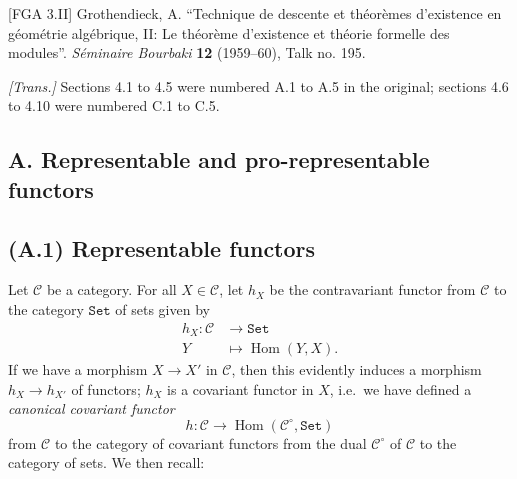 \documentclass{article}
\newcommand{\oldpage}[1]{\marginpar{\footnotesize$\Big\vert$ \textit{p.~#1}}}
\theoremstyle{definition}
\theoremstyle{definition}
\theoremstyle{definition}
\theoremstyle{definition}
\theoremstyle{remark}
\begin{document}
\providecommand{\scr}[1]{{\mathscr{#1}}}
\renewcommand{\cal}[1]{{\mathcal{#1}}}
\renewcommand{\frak}[1]{{\mathfrak{#1}}}
\renewcommand{\geq}{\geqslant}
\renewcommand{\leq}{\leqslant}

\providecommand{\simto}{\xrightarrow{\sim}}
\providecommand{\simfrom}{\xleftarrow{\sim}}
\providecommand{\Set}{\mathtt{Set}}

\providecommand{\id}{\operatorname{id}}
\providecommand{\Hom}{\operatorname{Hom}}
\providecommand{\repHom}{\underline{\Hom}}
\providecommand{\Aut}{\operatorname{Aut}}
\providecommand{\repAut}{\underline{\Aut}}
\providecommand{\HH}{\operatorname{H}}
\providecommand{\RR}{\operatorname{R}}
\providecommand{\GL}{\operatorname{GL}}
\providecommand{\Ga}{\operatorname{G_a}}
\providecommand{\Gm}{\operatorname{G_m}}
\providecommand{\SL}{\operatorname{SL}}
\providecommand{\Sp}{\operatorname{Sp}}
\providecommand{\Spec}{\operatorname{Spec}}
\providecommand{\Pro}{\operatorname{Pro}}
\providecommand{\Ext}{\operatorname{Ext}}
\providecommand{\op}{\circ}

{[}FGA 3.II{]}
Grothendieck, A.
``Technique de descente et théorèmes d'existence en géométrie algébrique, II: Le théorème d'existence et théorie formelle des modules''.
\emph{Séminaire Bourbaki} \textbf{12} (1959--60), Talk no. 195.

\emph{{[}Trans.{]}}
Sections 4.1 to 4.5 were numbered A.1 to A.5 in the original;
sections 4.6 to 4.10 were numbered C.1 to C.5.

\hypertarget{a.-representable-and-pro-representable-functors}{%
\subsection*{\texorpdfstring{\textbf{A.} Representable and pro-representable functors}{A. Representable and pro-representable functors}}\label{a.-representable-and-pro-representable-functors}}

\hypertarget{fga-3-ii-section-A.1}{%
\subsection{(A.1) Representable functors}\label{fga-3-ii-section-A.1}}

Let \({\mathcal{C}}\) be a category.
\oldpage{195-01}For all \(X\in{\mathcal{C}}\), let \(h_X\) be the contravariant functor from \({\mathcal{C}}\) to the category \(\mathtt{Set}\) of sets given by
\[
  \begin{aligned}
    h_X\colon {\mathcal{C}} &\to \mathtt{Set}
  \\Y&\mapsto \operatorname{Hom}(Y,X).
  \end{aligned}
\]
If we have a morphism \(X\to X'\) in \({\mathcal{C}}\), then this evidently induces a morphism \(h_X\to h_{X'}\) of functors;
\(h_X\) is a covariant functor in \(X\), i.e.~we have defined a \emph{canonical covariant functor}
\[
  h\colon {\mathcal{C}} \to \operatorname{Hom}({\mathcal{C}}^\circ,\mathtt{Set})
\]
from \({\mathcal{C}}\) to the category of covariant functors from the dual \({\mathcal{C}}^\circ\) of \({\mathcal{C}}\) to the category of sets.
We then recall:
\end{document}
